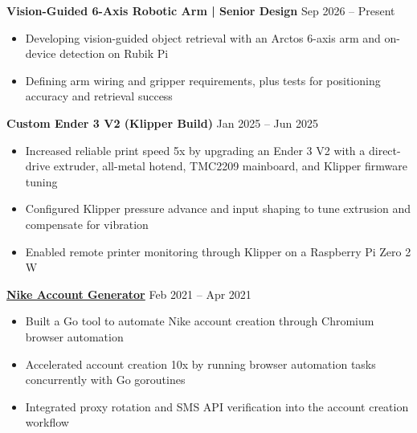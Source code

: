 \documentclass[11pt]{article}       %
\newcommand{\resumeSubheading}[3]{\textbf{#1}{#2} \hfill #3 \\ \vspace{-9pt}}
\newcommand{\resumeItem}[1]{\item #1}
\begin{document}
\resumeSubheading{Vision-Guided 6-Axis Robotic Arm | Senior Design}{}{Sep 2026 -- Present}
\begin{itemize}
  \resumeItem{Developing vision-guided object retrieval with an Arctos 6-axis arm and on-device detection on Rubik Pi}
  \resumeItem{Defining arm wiring and gripper requirements, plus tests for positioning accuracy and retrieval success}
\end{itemize}



\resumeSubheading{Custom Ender 3 V2 (Klipper Build)}{}{Jan 2025 -- Jun 2025}
\begin{itemize}
  \resumeItem{Increased reliable print speed 5x by upgrading an Ender 3 V2 with a direct-drive extruder, all-metal hotend, TMC2209 mainboard, and Klipper firmware tuning}
  \resumeItem{Configured Klipper pressure advance and input shaping to tune extrusion and compensate for vibration}
  \resumeItem{Enabled remote printer monitoring through Klipper on a Raspberry Pi Zero 2 W}
\end{itemize}

\resumeSubheading{\href{https://github.com/blayyd/dart-nike-gen/tree/main}{Nike Account Generator}}{}{Feb 2021 -- Apr 2021}
\begin{itemize}
  \resumeItem{Built a Go tool to automate Nike account creation through Chromium browser automation}
  \resumeItem{Accelerated account creation 10x by running browser automation tasks concurrently with Go goroutines}
  \resumeItem{Integrated proxy rotation and SMS API verification into the account creation workflow}
\end{itemize}
\end{document}
